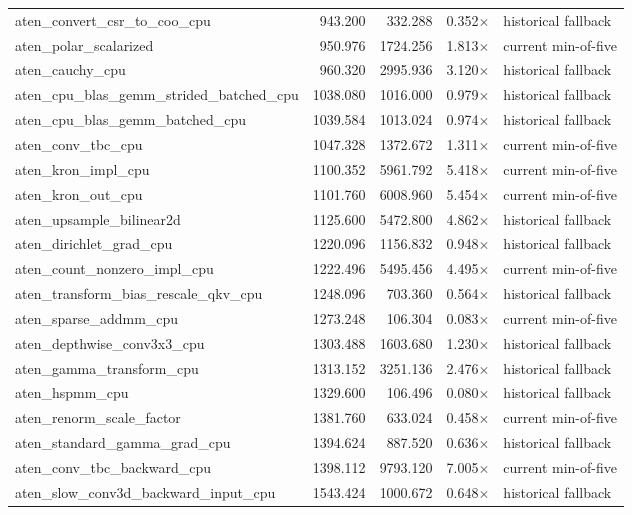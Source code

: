 \begin{longtable}{lrrrl}
  aten\_convert\_csr\_to\_coo\_cpu & 943.200 & 332.288 & 0.352$\times$ & historical fallback \\
  aten\_polar\_scalarized & 950.976 & 1724.256 & 1.813$\times$ & current min-of-five \\
  aten\_cauchy\_cpu & 960.320 & 2995.936 & 3.120$\times$ & historical fallback \\
  aten\_cpu\_blas\_gemm\_strided\_batched\_cpu & 1038.080 & 1016.000 & 0.979$\times$ & historical fallback \\
  aten\_cpu\_blas\_gemm\_batched\_cpu & 1039.584 & 1013.024 & 0.974$\times$ & historical fallback \\
  aten\_conv\_tbc\_cpu & 1047.328 & 1372.672 & 1.311$\times$ & current min-of-five \\
  aten\_kron\_impl\_cpu & 1100.352 & 5961.792 & 5.418$\times$ & current min-of-five \\
  aten\_kron\_out\_cpu & 1101.760 & 6008.960 & 5.454$\times$ & current min-of-five \\
  aten\_upsample\_bilinear2d & 1125.600 & 5472.800 & 4.862$\times$ & historical fallback \\
  aten\_dirichlet\_grad\_cpu & 1220.096 & 1156.832 & 0.948$\times$ & historical fallback \\
  aten\_count\_nonzero\_impl\_cpu & 1222.496 & 5495.456 & 4.495$\times$ & current min-of-five \\
  aten\_transform\_bias\_rescale\_qkv\_cpu & 1248.096 & 703.360 & 0.564$\times$ & historical fallback \\
  aten\_sparse\_addmm\_cpu & 1273.248 & 106.304 & 0.083$\times$ & current min-of-five \\
  aten\_depthwise\_conv3x3\_cpu & 1303.488 & 1603.680 & 1.230$\times$ & historical fallback \\
  aten\_gamma\_transform\_cpu & 1313.152 & 3251.136 & 2.476$\times$ & historical fallback \\
  aten\_hspmm\_cpu & 1329.600 & 106.496 & 0.080$\times$ & historical fallback \\
  aten\_renorm\_scale\_factor & 1381.760 & 633.024 & 0.458$\times$ & current min-of-five \\
  aten\_standard\_gamma\_grad\_cpu & 1394.624 & 887.520 & 0.636$\times$ & historical fallback \\
  aten\_conv\_tbc\_backward\_cpu & 1398.112 & 9793.120 & 7.005$\times$ & current min-of-five \\
  aten\_slow\_conv3d\_backward\_input\_cpu & 1543.424 & 1000.672 & 0.648$\times$ & historical fallback \\

\end{longtable}
